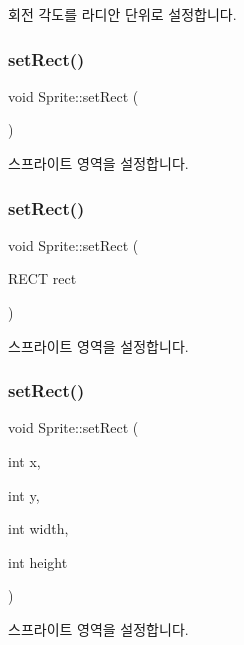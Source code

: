 회전 각도를 라디안 단위로 설정합니다. \mbox{\label{class_sprite_a7408db338ffbc3f72b9cdc5657d5356b}} 
\subsubsection{\texorpdfstring{setRect()}{setRect()}\hspace{0.1cm}{\footnotesize\ttfamily [1/3]}}
{\footnotesize\ttfamily void Sprite\+::set\+Rect (\begin{DoxyParamCaption}{ }\end{DoxyParamCaption})}

스프라이트 영역을 설정합니다. \mbox{\label{class_sprite_a99e56eaf275bd38be8ba500437f7ff12}} 
\subsubsection{\texorpdfstring{setRect()}{setRect()}\hspace{0.1cm}{\footnotesize\ttfamily [2/3]}}
{\footnotesize\ttfamily void Sprite\+::set\+Rect (\begin{DoxyParamCaption}\item[{R\+E\+CT}]{rect }\end{DoxyParamCaption})}

스프라이트 영역을 설정합니다. \mbox{\label{class_sprite_a47f0ac9f55ebdfa25d01fbc5c3a1b881}} 
\subsubsection{\texorpdfstring{setRect()}{setRect()}\hspace{0.1cm}{\footnotesize\ttfamily [3/3]}}
{\footnotesize\ttfamily void Sprite\+::set\+Rect (\begin{DoxyParamCaption}\item[{int}]{x,  }\item[{int}]{y,  }\item[{int}]{width,  }\item[{int}]{height }\end{DoxyParamCaption})}

스프라이트 영역을 설정합니다. \mbox{\label{class_sprite_a463c10936b40d8de3354e6383294a78a}} 
